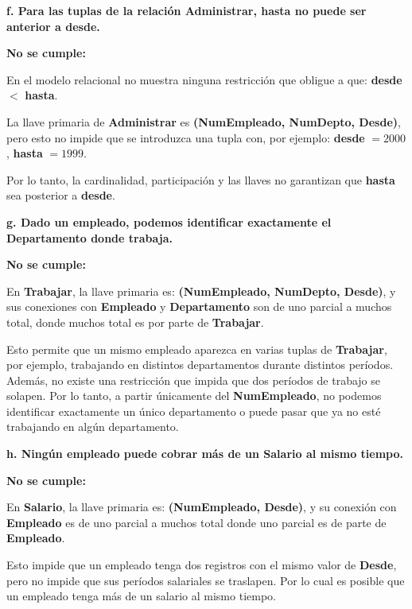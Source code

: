 
\noindent\textbf{f. Para las tuplas de la relación Administrar,
hasta no puede ser anterior a desde.}

\noindent\textbf{No se cumple:}

En el modelo relacional no muestra ninguna restricción que obligue a
que: \textbf{desde} $<$ \textbf{hasta}.

La llave primaria de \textbf{Administrar} es
\textbf{(NumEmpleado, NumDepto, Desde)}, pero esto no impide que se
introduzca una tupla con, por ejemplo:
\textbf{desde} $= 2000$, \textbf{hasta} $= 1999$.

Por lo tanto, la cardinalidad, participación y las llaves no garantizan
que \textbf{hasta} sea posterior a \textbf{desde}.

\vspace{0.5em}

\noindent\textbf{g. Dado un empleado, podemos identificar exactamente
el Departamento donde trabaja.}

\noindent\textbf{No se cumple:}

En \textbf{Trabajar}, la llave primaria es:
\textbf{(NumEmpleado, NumDepto, Desde)}, y sus conexiones con
\textbf{Empleado} y \textbf{Departamento} son de uno parcial a muchos
total, donde muchos total es por parte de \textbf{Trabajar}.

Esto permite que un mismo empleado aparezca en varias tuplas de
\textbf{Trabajar}, por ejemplo, trabajando en distintos departamentos
durante distintos períodos. Además, no existe una restricción que
impida que dos períodos de trabajo se solapen. Por lo tanto, a partir
únicamente del \textbf{NumEmpleado}, no podemos identificar exactamente
un único departamento o puede pasar que ya no esté trabajando en algún
departamento.

\vspace{0.5em}

\noindent\textbf{h. Ningún empleado puede cobrar más de un Salario al
mismo tiempo.}

\noindent\textbf{No se cumple:}

En \textbf{Salario}, la llave primaria es:
\textbf{(NumEmpleado, Desde)}, y su conexión con \textbf{Empleado}
es de uno parcial a muchos total donde uno parcial es de parte de
\textbf{Empleado}.

Esto impide que un empleado tenga dos registros con el mismo valor de
\textbf{Desde}, pero no impide que sus períodos salariales se traslapen.
Por lo cual es posible que un empleado tenga más de un salario al
mismo tiempo.

